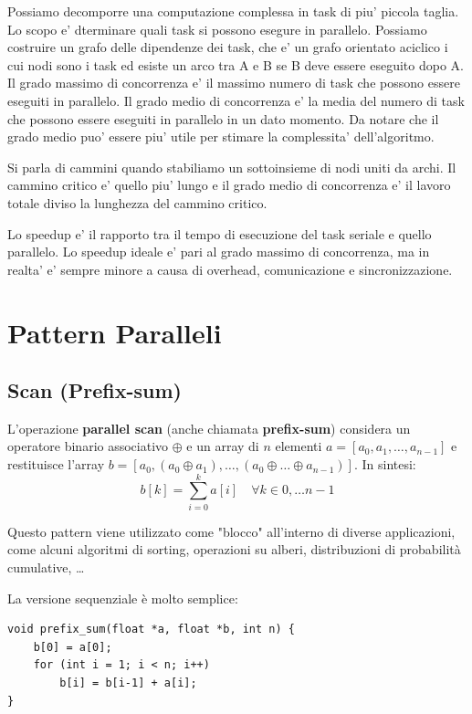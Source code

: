 Possiamo decomporre una computazione complessa in task di piu' piccola taglia. Lo scopo e' dterminare quali task si possono esegure in parallelo.
Possiamo costruire un grafo delle dipendenze dei task, che e' un grafo orientato aciclico i cui nodi sono i task ed esiste un arco tra A e B se B deve essere eseguito dopo A.
Il grado massimo di concorrenza e' il massimo numero di task che possono essere eseguiti in parallelo.
Il grado medio di concorrenza e' la media del numero di task che possono essere eseguiti in parallelo in un dato momento. Da notare che il grado medio puo' essere piu' utile per stimare la complessita' dell'algoritmo.

Si parla di cammini quando stabiliamo un sottoinsieme di nodi uniti da archi. Il cammino critico e' quello piu' lungo e il grado medio di concorrenza e' il lavoro totale diviso la lunghezza del cammino critico.

Lo speedup e' il rapporto tra il tempo di esecuzione del task seriale e quello parallelo. Lo speedup ideale e' pari al grado massimo di concorrenza, ma in realta' e' sempre minore a causa di overhead, comunicazione e sincronizzazione.

\section{Pattern Paralleli}

\subsection{Scan (Prefix-sum)}

L'operazione \textbf{parallel scan} (anche chiamata \textbf{prefix-sum}) considera un operatore binario associativo $\oplus$ e un array di $n$ elementi $a = [a_0, a_1, \dots, a_{n-1}]$ e restituisce l'array $b = [a_0, (a_0 \oplus a_1), \dots, (a_0 \oplus \dots \oplus a_{n-1})]$. In sintesi:
$$ b[k] = \sum_{i=0}^{k} a[i] \quad \forall k \in 0, \dots n-1 $$

Questo pattern viene utilizzato come "blocco" all'interno di diverse applicazioni, come alcuni algoritmi di sorting, operazioni su alberi, distribuzioni di probabilità cumulative, \dots

La versione sequenziale è molto semplice:
\begin{lstlisting}[caption={prefix\_sum C}, label={lst:prefix_sum}]
void prefix_sum(float *a, float *b, int n) {
    b[0] = a[0];
    for (int i = 1; i < n; i++)
        b[i] = b[i-1] + a[i];
}
\end{lstlisting}

